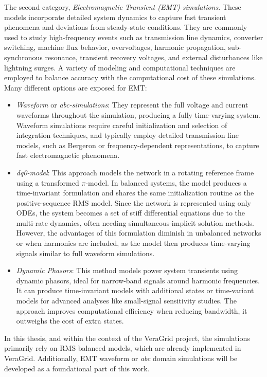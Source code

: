 The second category, \textit{Electromagnetic Transient (EMT) simulations}. These models incorporate detailed system dynamics to capture fast transient phenomena and deviations 
from steady-state conditions. They are commonly used to study high-frequency events such as transmission line dynamics, converter switching, machine flux behavior, 
overvoltages, harmonic propagation, sub-synchronous resonance, transient recovery voltages, and external disturbances like lightning surges. 
A variety of modeling and computational techniques are employed to balance accuracy with the computational cost of these simulations.
Many different options are exposed for EMT:

\begin{itemize}
    \item \textit{Waveform} or \textit{abc-simulations}: They represent the full voltage and current waveforms throughout the simulation, producing a fully time-varying system. 
Waveform simulations require careful initialization and selection of integration techniques, and typically employ detailed transmission line models, such as Bergeron or frequency-dependent
representations, to capture fast electromagnetic phenomena.
    \item \textit{dq0-model}: This approach models the network in a rotating reference frame using a transformed $\pi$-model. In balanced systems, the model produces a time-invariant 
    formulation and shares the same initialization routine as the positive-sequence RMS model. Since the network is represented using only ODEs, the system becomes a set of 
    stiff differential equations due to the multi-rate dynamics, often needing simultaneous-implicit solution methods. However, the advantages of this 
    formulation diminish in unbalanced networks or when harmonics are included, as the model then produces time-varying signals similar to full waveform simulations.
    \item \textit{Dynamic Phasors}: This method models power system transients using dynamic phasors, ideal for narrow-band signals around harmonic frequencies. 
    It can produce time-invariant models with additional states or time-variant models for advanced analyses like small-signal sensitivity studies. 
    The approach improves computational efficiency when reducing bandwidth, it outweighs the cost of extra states.
\end{itemize}

In this thesis, and within the context of the VeraGrid project, the simulations primarily rely on RMS balanced models, which are already implemented in VeraGrid. 
Additionally, EMT waveform  or \textit{abc} domain simulations will be developed as a foundational part of this work.


